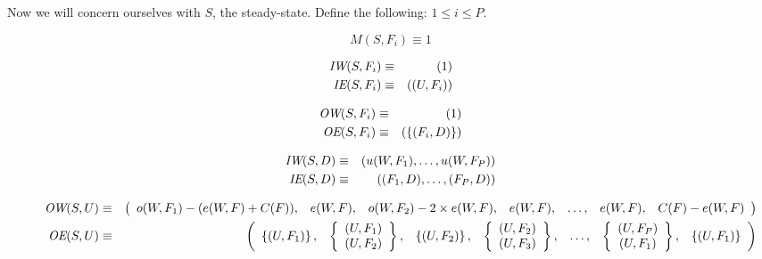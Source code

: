 Now we will concern ourselves with $S$, the steady-state.  Define the
following: $1 \le i \le P$.
 
$$ M(S,F_i) \equiv 1 $$

\begin{eqnarray*}
\mbox{\it IW}(S,F_i) & \equiv & (1) \\
\mbox{\it IE}(S,F_i) & \equiv & ((U,F_i)) 
\end{eqnarray*}

\begin{eqnarray*} 
\mbox{\it OW}(S,F_i) & \equiv & (1) \\
\mbox{\it OE}(S,F_i) & \equiv & (\{(F_i, D)\}) 
\end{eqnarray*} 

\begin{eqnarray*} 
\mbox{\it IW}(S,D) & \equiv & (u(W,F_1),\ldots,u(W, F_P)) \\
\mbox{\it IE}(S,D) & \equiv & ((F_1, D),\dots,(F_P, D)) 
\end{eqnarray*}

\begin{figure*}[t]
\begin{eqnarray*} 
\mbox{\it OW}(S,U) & \equiv & \left( \begin{array}{ccccccc} 
o(W,F_1) - (e(W,F) + C(F)), & e(W,F), & o(W,F_2) - 2 \times e(W,F), &
e(W,F), & \ldots, & e(W,F), & C(F) - e(W,F) \end{array} \right) \\
\mbox{\it OE}(S,U) & \equiv  & 
\left( 
\begin{array}{ccccccc} 
	\left\{ (U,F_1) \right\}, & 
	\left\{	
		\begin{array}{c} (U,F_1) \\ (U,F_2) 
		\end{array} 
	\right\}, &
	\left\{ (U,F_2) \right\}, & 
	\left\{	
		\begin{array}{c} (U,F_2) \\ (U,F_3) 
		\end{array} 
	\right\}, &
	\ldots, & 	
	\left\{	
		\begin{array}{c} (U,F_P) \\ (U,F_1) 
		\end{array} 
	\right\}, &
	\left\{ (U,F_1) \right\} 
\end{array} \right)
\end{eqnarray*} 
\end{figure*}